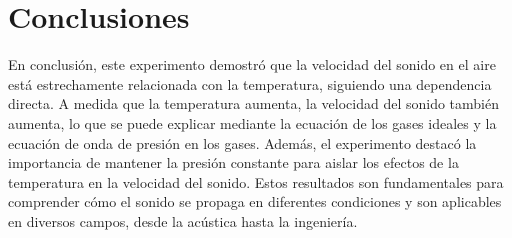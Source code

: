 \documentclass[twocolumn, 12pt]{article}
\begin{document}
\section{Conclusiones}

En conclusión, este experimento demostró que la velocidad
del sonido en el aire está estrechamente relacionada con la
temperatura, siguiendo una dependencia directa. A medida
que la temperatura aumenta, la velocidad del sonido también
aumenta, lo que se puede explicar mediante la ecuación de
los gases ideales y la ecuación de onda de presión en los
gases. Además, el experimento destacó la importancia de
mantener la presión constante para aislar los efectos de la
temperatura en la velocidad del sonido. Estos resultados
son fundamentales para comprender cómo el sonido se propaga
en diferentes condiciones y son aplicables en diversos
campos, desde la acústica hasta la ingeniería.

\printbibliography
\end{document}
